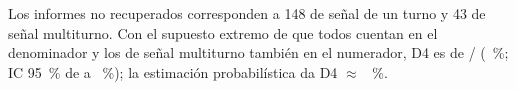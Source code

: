 Los informes no recuperados corresponden a 148 de señal de un turno y 43 de señal multiturno. Con el supuesto extremo de que todos cuentan en el denominador y los de señal multiturno también en el numerador, D4 es de \DcuatroCotaK/\DcuatroCotaN{} (\DcuatroCotaPct~\%; IC 95~\% de \DcuatroCotaICinf{} a \DcuatroCotaICsup~\%); la estimación probabilística da D4 $\approx$ \DcuatroProbPct~\%.
